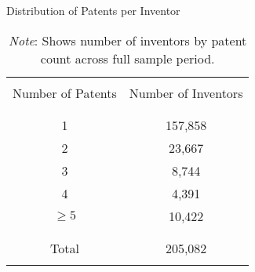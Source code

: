\begin{table}[H]
\centering
\renewcommand{\arraystretch}{.6}
\caption{Distribution of Patents per Inventor}
\label{tab:patents_by_inventor}
\begin{tabular}{cc}
\hline
\\[-0.5em]
Number of Patents & Number of Inventors \\
\\[-0.5em]
\hline
\\[-0.5em]
1 & 157,858 \\
2 & 23,667 \\
3 & 8,744 \\
4 & 4,391 \\
$\geq 5$ & 10,422 \\
\\[-0.5em]
\hline
\\[-0.5em]
Total & 205,082 \\
\\[-0.5em]
\hline
\end{tabular}
\caption*{\textit{Note}: Shows number of inventors by patent count across full sample period.}
\end{table}